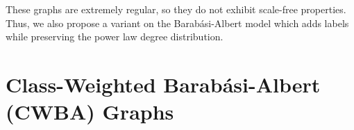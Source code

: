 




These graphs are extremely regular, so they do not exhibit scale-free properties. Thus, we
also propose a variant on the Barab\'asi-Albert model which adds labels while preserving the power
law degree distribution.



\section{Class-Weighted Barab\'{a}si-Albert (CWBA) Graphs}

